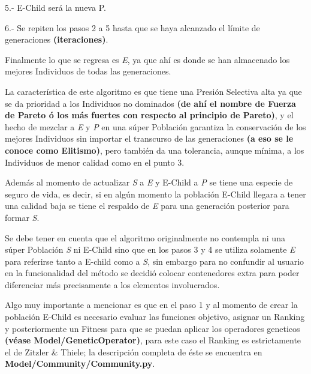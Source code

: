 \documentclass[letterpaper,10pt,english]{sphinxmanual}
\begin{document}
\begin{DUlineblock}{0em}
\item[] 5.- E-Child será la nueva P.
\end{DUlineblock}

\begin{DUlineblock}{0em}
\item[] 6.- Se repiten los pasos 2 a 5 hasta que se haya alcanzado el límite de generaciones \textbf{(iteraciones)}.
\end{DUlineblock}

\begin{DUlineblock}{0em}
\item[] Finalmente lo que se regresa es \emph{E}, ya que ahí es donde se han
almacenado los mejores Individuos de todas las generaciones.
\item[] 
\item[] La característica de este algoritmo es que tiene una Presión Selectiva alta ya que
se da prioridad a los Individuos no dominados \textbf{(de ahí el nombre de
Fuerza de Pareto ó los más fuertes con respecto al principio de Pareto)},
y el hecho de mezclar a \emph{E} y \emph{P} en una súper Población garantiza la conservación
de los mejores Individuos sin importar el transcurso de las generaciones
\textbf{(a eso se le conoce como Elitismo)}, pero también da una tolerancia, aunque mínima, a los
Individuos de menor calidad como en el punto 3.
\item[] Además al momento de actualizar \emph{S} a \emph{E} y E-Child a \emph{P} se tiene una especie de
seguro de vida, es decir, si en algún momento la población E-Child llegara a
tener una calidad baja se tiene el respaldo de \emph{E} para una generación posterior
para formar \emph{S}.
\item[] 
\item[] Se debe tener en cuenta que el algoritmo originalmente no contempla ni una súper
Población \emph{S} ni E-Child sino que en los pasos 3 y 4 se utiliza solamente \emph{E} para referirse tanto a E-child como a \emph{S},
sin embargo para no confundir al usuario en la funcionalidad del método se decidió colocar contenedores
extra para poder diferenciar más precisamente a los elementos involucrados.
\item[] 
\item[] Algo muy importante a mencionar es que en el paso 1 y al momento de crear la población E-Child
es necesario evaluar las funciones objetivo, asignar un Ranking y posteriormente un Fitness
para que se puedan aplicar los operadores geneticos \textbf{(véase Model/GeneticOperator)}, para este caso
el Ranking es estrictamente el de Zitzler \& Thiele; la descripción completa de éste se
encuentra en \textbf{Model/Community/Community.py}.
\end{DUlineblock}
\label{Model/MOEA/SPEAII:module-Model.MOEA.SPEAII}
\end{document}
